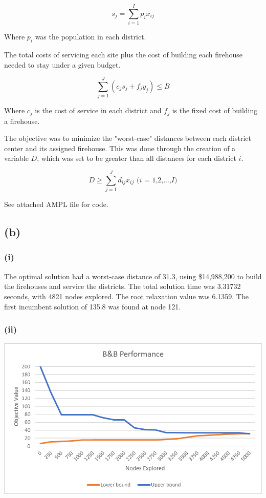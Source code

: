 \documentclass[12pt, letterpaper]{article}
\begin{document}
$$s_j = \sum_{i=1}^{I} p_{i}x_{ij}$$

Where $p_i$ was the population in each district. 

The total costs of servicing each site plus the cost of building each firehouse needed to stay under a given budget. 

$$ \sum_{j=1}^{J} (c_{j}s_{j} + f_{j}y_{j}) \leq B$$

Where $c_j$ is the cost of service in each district and $f_j$ is the fixed cost of building a firehouse.

The objective was to minimize the "worst-case" distances between each district center and its assigned firehouse. This was done through the creation of a variable $D$, which was set to be greater than all distances for each district $i$. 

$$ D \geq \sum_{j=1}^{J} d_{ij}x_{ij} \text{  ($i$ = 1,2,...,$I$)}$$


See attached AMPL file for code. 


\subsection*{(b)}
\subsubsection*{(i)}
The optimal solution had a worst-case distance of 31.3, using \$14,988,200 to build the firehouses and service the districts. The total 
solution time was 3.31732 seconds, with 4821 nodes explored. The root relaxation value was 6.1359. The first incumbent solution of 135.8 was found at node 121. 
\subsubsection*{(ii)}

\begin{center}
\includegraphics[scale=1]{B&B_performance}
\end{center}
\end{document}
